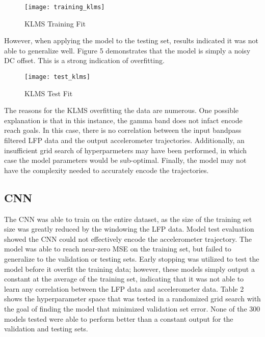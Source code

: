 \documentclass[12pt]{article}
\begin{document}
\begin{figure}[h]
\caption{KLMS Training Fit}
\centering
\texttt{[image: training\_klms]}
\label{training_klms}
\end{figure}

However, when applying the model to the testing set, results indicated it was not able to generalize well. Figure 5 demonstrates that the model is simply a noisy DC offset. This is a strong indication of overfitting.

\begin{figure}[h]
\caption{KLMS Test Fit}
\centering
\texttt{[image: test\_klms]}
\end{figure}

The reasons for the KLMS overfitting the data are numerous. One possible explanation is that in this instance, the gamma band does not infact encode reach goals. In this case, there is no correlation between the input bandpass filtered LFP data and the output accelerometer trajectories. Additionally, an insufficient grid search of hyperparmeters may have been performed, in which case the model parameters would be sub-optimal. Finally, the model may not have the complexity needed to accurately encode the trajectories.

\subsection{CNN}

The CNN was able to train on the entire dataset, as the size of the training set size was greatly reduced by the windowing the LFP data. Model test evaluation showed the CNN could not effectively encode the accelerometer trajectory. The model was able to reach near-zero MSE on the training set, but failed to generalize to the validation or testing sets. Early stopping was utilized to test the model before it overfit the training data; however, these models simply output a constant at the average of the training set, indicating that it was not able to learn any correlation between the LFP data and accelerometer data. Table 2 shows the hyperparameter space that was tested in a randomized grid search with the goal of finding the model that minimized validation set error. None of the 300 models tested were able to perform better than a constant output for the validation and testing sets.
\end{document}
